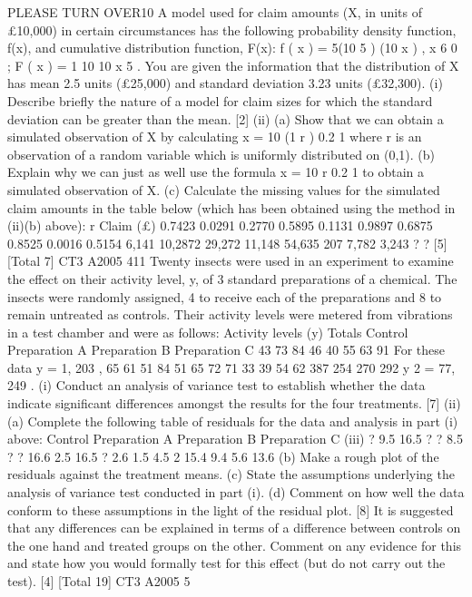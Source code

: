 \documentclass[a4paper,12pt]{article}
\begin{document}
\begin{enumerate}
PLEASE TURN OVER10
A model used for claim amounts (X, in units of £10,000) in certain circumstances has
the following probability density function, f(x), and cumulative distribution function,
F(x):
f ( x ) =
5(10 5 )
(10 x )
, x
6
0 ; F ( x ) = 1
10
10 x
5
.
You are given the information that the distribution of X has mean 2.5 units (£25,000)
and standard deviation 3.23 units (£32,300).
(i) Describe briefly the nature of a model for claim sizes for which the standard
deviation can be greater than the mean.
[2]
(ii) (a)
Show that we can obtain a simulated observation of X by calculating
x = 10 (1 r )
0.2
1
where r is an observation of a random variable which is uniformly
distributed on (0,1).
(b)
Explain why we can just as well use the formula
x = 10 r
0.2
1
to obtain a simulated observation of X.
(c)
Calculate the missing values for the simulated claim amounts in the
table below (which has been obtained using the method in (ii)(b)
above):
r Claim (£)
0.7423
0.0291
0.2770
0.5895
0.1131
0.9897
0.6875
0.8525
0.0016
0.5154 6,141
10,2872
29,272
11,148
54,635
207
7,782
3,243
?
?
[5]
[Total 7]
CT3 A2005
411
Twenty insects were used in an experiment to examine the effect on their activity
level, y, of 3 standard preparations of a chemical. The insects were randomly
assigned, 4 to receive each of the preparations and 8 to remain untreated as controls.
Their activity levels were metered from vibrations in a test chamber and were as
follows:
Activity levels (y)
Totals
Control
Preparation A
Preparation B
Preparation C 43
73
84
46
40
55
63
91
For these data y = 1, 203 ,
65
61
51
84
51
65
72
71
33
39
54
62
387
254
270
292
y 2 = 77, 249 .
(i) Conduct an analysis of variance test to establish whether the data indicate
significant differences amongst the results for the four treatments.
[7]
(ii) (a)
Complete the following table of residuals for the data and analysis in
part (i) above:
Control
Preparation A
Preparation B
Preparation C
(iii)
?
9.5
16.5
?
?
8.5
?
?
16.6
2.5
16.5
?
2.6
1.5
4.5
2
15.4
9.4
5.6 13.6
(b) Make a rough plot of the residuals against the treatment means.
(c) State the assumptions underlying the analysis of variance test
conducted in part (i).
(d) Comment on how well the data conform to these assumptions in the
light of the residual plot.
[8]
It is suggested that any differences can be explained in terms of a difference
between controls on the one hand and treated groups on the other.
Comment on any evidence for this and state how you would formally test for
this effect (but do not carry out the test).
[4]
[Total 19]
CT3 A2005
5




\end{enumerate}
\end{document}
